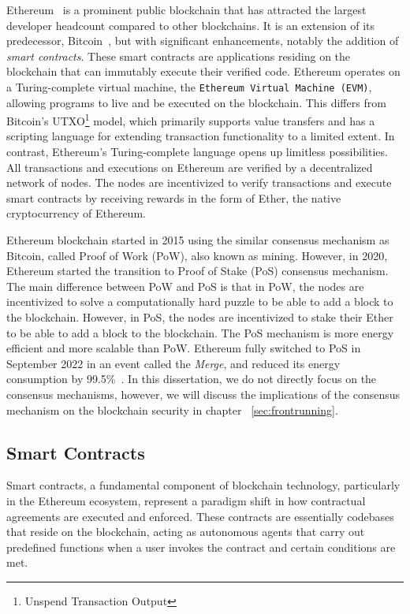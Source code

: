 Ethereum~\cite{wood2014ethereum} is a prominent public blockchain that has attracted the largest developer headcount compared to other blockchains. It is an extension of its predecessor, Bitcoin~\cite{nakamoto2008bitcoin}, but with significant enhancements, notably the addition of \textit{smart contracts}. These smart contracts are applications residing on the blockchain that can immutably execute their verified code. Ethereum operates on a Turing-complete virtual machine, the \texttt{Ethereum Virtual Machine (EVM)}, allowing programs to live and be executed on the blockchain. This differs from Bitcoin's UTXO\footnote{Unspend Transaction Output} model, which primarily supports value transfers and has a scripting language for extending transaction functionality to a limited extent. In contrast, Ethereum's Turing-complete language opens up limitless possibilities.  All transactions and executions on Ethereum are verified by a decentralized network of nodes. The nodes are incentivized to verify transactions and execute smart contracts by receiving rewards in the form of Ether, the native cryptocurrency of Ethereum. 

Ethereum blockchain started in 2015 using the similar consensus mechanism as Bitcoin, called Proof of Work (PoW), also known as mining. However, in 2020, Ethereum started the transition to Proof of Stake (PoS) consensus mechanism. The main difference between PoW and PoS is that in PoW, the nodes are incentivized to solve a computationally hard puzzle to be able to add a block to the blockchain. However, in PoS, the nodes are incentivized to stake their Ether to be able to add a block to the blockchain. The PoS mechanism is more energy efficient and more scalable than PoW. Ethereum fully switched to PoS in September 2022 in an event called the \textit{Merge}, and reduced its energy consumption by 99.5\%~\cite{themerge}. In this dissertation, we do not directly focus on the consensus mechanisms, however, we will discuss the implications of the consensus mechanism on the blockchain security in chapter ~\ref{sec:frontrunning}. 


\subsection{Smart Contracts}
Smart contracts, a fundamental component of blockchain technology, particularly in the Ethereum ecosystem, represent a paradigm shift in how contractual agreements are executed and enforced. These contracts are essentially codebases that reside on the blockchain, acting as autonomous agents that carry out predefined functions when a user invokes the contract and certain conditions are met. 

